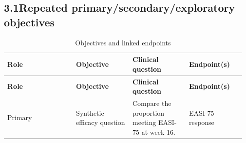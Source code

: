 \documentclass[11pt,a4paper]{article}
\begin{document}
\subsection{3.1\quad Repeated primary/secondary/exploratory objectives}\label{section.3.1}
\begin{longtable}{@{}>{\RaggedRight}p{0.28\linewidth}>{\RaggedRight}p{0.23\linewidth}>{\RaggedRight}p{0.23\linewidth}>{\RaggedRight}p{0.23\linewidth}@{}}
\caption{Objectives and linked endpoints}\\ \toprule
\textbf{\small Role} & \textbf{\small Objective} & \textbf{\small Clinical question} & \textbf{\small Endpoint(s)} \\ \midrule\endfirsthead
\textbf{\small Role} & \textbf{\small Objective} & \textbf{\small Clinical question} & \textbf{\small Endpoint(s)} \\ \midrule\endhead
\small Primary & \small Synthetic efficacy question & \small Compare the proportion meeting EASI-75 at week 16. & \small EASI-75 response \\
\bottomrule
\end{longtable}
\end{document}
